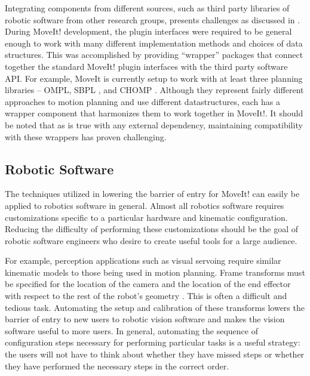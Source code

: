 \documentclass[10pt,journal,compsoc]{joser1}
\begin{document}
{Integrating components from different sources, such as third party libraries of robotic software from other research groups, presents challenges as discussed in \cite{brugali2010component}. During MoveIt! development, the plugin interfaces were required to be general enough to work with many different implementation methods and choices of data structures. This was accomplished by providing ``wrapper'' packages that connect together the standard MoveIt! plugin interfaces with the third party software API. For example, MoveIt is currently setup to work with at least three planning libraries -- OMPL, SBPL \cite{likhachevsbpl}, and CHOMP \cite{ratliff2009chomp}. Although they represent fairly different approaches to motion planning and use different datastructures, each has a wrapper component that harmonizes them to work together in MoveIt!. It should be noted that as is true with any external dependency, maintaining compatibility with these wrappers has proven challenging.

\subsection{Robotic Software}
\label{sec::robotic_discussion}

The techniques utilized in lowering the barrier of entry for MoveIt! can easily
be applied to robotics software in general. Almost all robotics software
requires customizations specific to a particular hardware and kinematic
configuration. Reducing the difficulty of performing these customizations should
be the goal of robotic software engineers who desire to create useful tools for
a large audience. 

For example, perception applications such as visual servoing require similar
kinematic models to those being used in motion planning. Frame transforms must
be specified for the location of the camera and the location of the end effector
with respect to the rest of the robot's geometry \cite{visual_servoing}. This is
often a difficult and tedious task. Automating the setup and calibration of
these transforms lowers the barrier of entry to new users to robotic vision
software and makes the vision software useful to more users. In general,
automating the sequence of configuration steps necessary for performing
particular tasks is a useful strategy: the users will not have to think about
whether they have missed steps or whether they have performed the necessary
steps in the correct order. 

}
\end{document}
